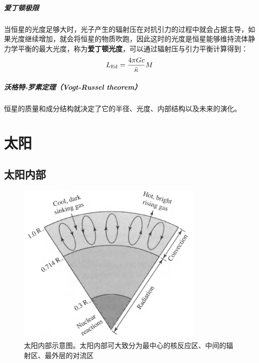 \documentclass[openany]{ctexbook}
\begin{document}
\paragraph{爱丁顿极限}
当恒星的光度足够大时，光子产生的辐射压在对抗引力的过程中就会占据主导，如果光度继续增加，就会将恒星的物质吹跑，因此这时的光度是恒星能够维持流体静力学平衡的最大光度，称为\textbf{爱丁顿光度}，可以通过辐射压与引力平衡计算得到：
\begin{equation}
  L_\mathrm{Ed}={4\pi Gc \over \bar\kappa}M
\end{equation}

\paragraph{沃格特-罗素定理（Vogt-Russel theorem）}
恒星的质量和成分结构就决定了它的半径、光度、内部结构以及未来的演化。

\chapter{太阳}
\section{太阳内部}
\begin{figure}[hbt]
  \centering
  \includegraphics[width=9cm]{chapters/11/interior}
  \caption{太阳内部示意图。太阳内部可大致分为最中心的核反应区、中间的辐射区、最外层的对流区}
  \label{}
\end{figure}
\end{document}
